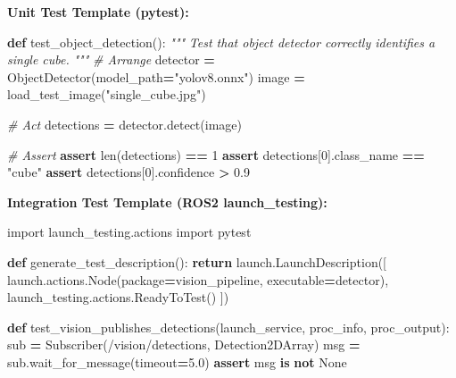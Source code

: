 \documentclass[
]{article}
\newenvironment{Shaded}{\begin{snugshade}}{\end{snugshade}}
\newcommand{\BuiltInTok}[1]{#1}
\newcommand{\CommentTok}[1]{\textcolor[rgb]{0.56,0.35,0.01}{\textit{#1}}}
\newcommand{\ControlFlowTok}[1]{\textcolor[rgb]{0.13,0.29,0.53}{\textbf{#1}}}
\newcommand{\DecValTok}[1]{\textcolor[rgb]{0.00,0.00,0.81}{#1}}
\newcommand{\FloatTok}[1]{\textcolor[rgb]{0.00,0.00,0.81}{#1}}
\newcommand{\ImportTok}[1]{#1}
\newcommand{\KeywordTok}[1]{\textcolor[rgb]{0.13,0.29,0.53}{\textbf{#1}}}
\newcommand{\NormalTok}[1]{#1}
\newcommand{\OperatorTok}[1]{\textcolor[rgb]{0.81,0.36,0.00}{\textbf{#1}}}
\newcommand{\StringTok}[1]{\textcolor[rgb]{0.31,0.60,0.02}{#1}}
\newcommand{\VariableTok}[1]{\textcolor[rgb]{0.00,0.00,0.00}{#1}}
\begin{document}
\textbf{Unit Test Template (pytest):}

\begin{Shaded}
\begin{Highlighting}[]
\KeywordTok{def}\NormalTok{ test\_object\_detection():}
    \CommentTok{"""}
\CommentTok{    Test that object detector correctly identifies a single cube.}
\CommentTok{    """}
    \CommentTok{\# Arrange}
\NormalTok{    detector }\OperatorTok{=}\NormalTok{ ObjectDetector(model\_path}\OperatorTok{=}\StringTok{"yolov8.onnx"}\NormalTok{)}
\NormalTok{    image }\OperatorTok{=}\NormalTok{ load\_test\_image(}\StringTok{"single\_cube.jpg"}\NormalTok{)}

    \CommentTok{\# Act}
\NormalTok{    detections }\OperatorTok{=}\NormalTok{ detector.detect(image)}

    \CommentTok{\# Assert}
    \ControlFlowTok{assert} \BuiltInTok{len}\NormalTok{(detections) }\OperatorTok{==} \DecValTok{1}
    \ControlFlowTok{assert}\NormalTok{ detections[}\DecValTok{0}\NormalTok{].class\_name }\OperatorTok{==} \StringTok{"cube"}
    \ControlFlowTok{assert}\NormalTok{ detections[}\DecValTok{0}\NormalTok{].confidence }\OperatorTok{\textgreater{}} \FloatTok{0.9}
\end{Highlighting}
\end{Shaded}

\textbf{Integration Test Template (ROS2 launch\_testing):}

\begin{Shaded}
\begin{Highlighting}[]
\ImportTok{import}\NormalTok{ launch\_testing.actions}
\ImportTok{import}\NormalTok{ pytest}

\KeywordTok{def}\NormalTok{ generate\_test\_description():}
    \ControlFlowTok{return}\NormalTok{ launch.LaunchDescription([}
\NormalTok{        launch.actions.Node(package}\OperatorTok{=}\StringTok{\textquotesingle{}vision\_pipeline\textquotesingle{}}\NormalTok{, executable}\OperatorTok{=}\StringTok{\textquotesingle{}detector\textquotesingle{}}\NormalTok{),}
\NormalTok{        launch\_testing.actions.ReadyToTest()}
\NormalTok{    ])}

\KeywordTok{def}\NormalTok{ test\_vision\_publishes\_detections(launch\_service, proc\_info, proc\_output):}
\NormalTok{    sub }\OperatorTok{=}\NormalTok{ Subscriber(}\StringTok{\textquotesingle{}/vision/detections\textquotesingle{}}\NormalTok{, Detection2DArray)}
\NormalTok{    msg }\OperatorTok{=}\NormalTok{ sub.wait\_for\_message(timeout}\OperatorTok{=}\FloatTok{5.0}\NormalTok{)}
    \ControlFlowTok{assert}\NormalTok{ msg }\KeywordTok{is} \KeywordTok{not} \VariableTok{None}
\end{Highlighting}
\end{Shaded}
\end{document}
